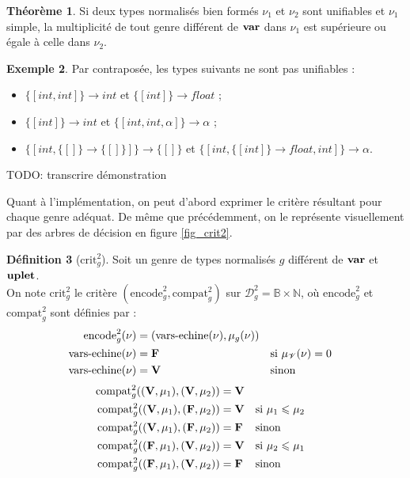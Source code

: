 \documentclass[a4paper]{report}
\theoremstyle{definition}
\newtheorem{theoreme}{Théorème}
\newtheorem{definition}[theoreme]{Définition}
\newtheorem{exemple}[theoreme]{Exemple}
\newcommand{\mset}[1]{\{\![#1]\!\}}
\newcommand{\V}{\mathscr{V}}
\newcommand{\mathhyphen}{{\hbox{-}}}
\begin{document}
\begin{theoreme}
	Si deux types normalisés bien formés $\nu_1$ et $\nu_2$ sont unifiables et $\nu_1$ simple, la multiplicité de tout genre différent de $\bold{var}$ dans $\nu_1$ est supérieure ou égale à celle dans $\nu_2$.
\end{theoreme}

\begin{exemple}
	Par contraposée, les types suivants ne sont pas unifiables :
	\begin{itemize}
		\item $\mset{int, int} \rightarrow int$ et $\mset{int} \rightarrow float$ ;
		\item $\mset{int} \rightarrow int$ et $\mset{int, int, \alpha} \rightarrow \alpha$ ;
		\item $\mset{int, \mset{} \rightarrow \mset{}} \rightarrow \mset{}$ et $\mset{int, \mset{int} \rightarrow float, int} \rightarrow \alpha$.
	\end{itemize}
\end{exemple}

TODO: transcrire démonstration

Quant à l'implémentation, on peut d'abord exprimer le critère résultant pour chaque genre adéquat. De même que précédemment, on le représente visuellement par des arbres de décision en figure \ref{fig_crit2}.

\begin{definition}[$\mathrm{crit}^2_g$]
	Soit un genre de types normalisés $g$ différent de $\bold{var}$ et $\bold{uplet}$. \\
	On note $\mathrm{crit}^2_g$ le critère $(\mathrm{encode}^2_g, \mathrm{compat}^2_g)$ sur $\mathscr{D}^2_{g} = \mathbb{B} \times \mathbb{N}$, où $\mathrm{encode}^2_g$ et $\mathrm{compat}^2_g$ sont définies par :
	\begin{align*}
			\mathrm{encode}^2_g (\nu) &=
			(\mathrm{vars\mathhyphen echine} (\nu), \mu_g (\nu))
		\\
			\mathrm{vars\mathhyphen echine} (\nu) &=
			\bold{F} &&
			\text{si } \mu_\V (\nu) = 0
		\\
			\mathrm{vars\mathhyphen echine} (\nu) &=
			\bold{V} &&
			\text{sinon}
	\end{align*}
	\begin{align*}
			\mathrm{compat}^2_g ((\bold{V}, \mu_1), (\bold{V}, \mu_2)) &=
			\bold{V}
		\\
			\mathrm{compat}^2_g ((\bold{V}, \mu_1), (\bold{F}, \mu_2)) &=
			\bold{V} &&
			\text{si } \mu_1 \leqslant \mu_2
		\\
			\mathrm{compat}^2_g ((\bold{V}, \mu_1), (\bold{F}, \mu_2)) &=
			\bold{F} &&
			\text{sinon}
		\\
			\mathrm{compat}^2_g ((\bold{F}, \mu_1), (\bold{V}, \mu_2)) &=
			\bold{V} &&
			\text{si } \mu_2 \leqslant \mu_1
		\\
			\mathrm{compat}^2_g ((\bold{F}, \mu_1), (\bold{V}, \mu_2)) &=
			\bold{F} &&
			\text{sinon}
	\end{align*}
\end{definition}
\end{document}
